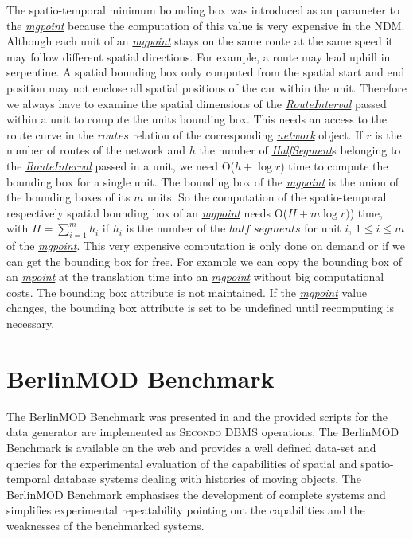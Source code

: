 \documentclass[a4paper]{article}
\newcommand{\secondo}{\textsc{Secondo}}
\newcommand{\bmodb} {BerlinMOD Benchmark}
\newcommand{\dt}[1]{\textsl{\underline{#1}}}
\begin{document}
{The spatio-temporal minimum bounding box was introduced as an parameter to the
\dt{mgpoint} because the computation of this value is very expensive in the
NDM. Although each unit of an \dt{mgpoint} stays on the same route
at the same speed it may follow different spatial directions. For example, a route may
lead uphill in serpentine. A spatial bounding box only computed from the spatial
start and end position may not enclose all spatial positions of the car within
the unit. Therefore we always have to examine the spatial dimensions of the
\dt{RouteInterval} passed within a unit to compute the units bounding box. This
needs an access to the route curve in the $routes$ relation of the corresponding
\dt{network} object. If $r$ is the number of routes
of the network and $h$ the number of \dt{HalfSegment}s belonging to the \dt{RouteInterval}
passed in a unit, we need O($h + \log r$) time to
compute the bounding box for a single unit. The bounding box of the \dt{mgpoint}
is the union of the bounding boxes of its $m$ units. So the computation of the
spatio-temporal respectively spatial bounding box of an \dt{mgpoint} needs
O($H + m \log r)$) time, with $H = \sum_{i=1}^m {h_i}$ if $h_i$ is the number of the
$half$ $segments$ for unit $i$, $1 \leq i \leq m$ of the \dt{mgpoint}. This very expensive computation is only done
on demand or if we can get the bounding box for free. For example we can copy
the bounding box of an \dt{mpoint} at the translation time into an \dt{mgpoint}
without big computational costs. The bounding box attribute is not maintained. If
the \dt{mgpoint} value changes, the bounding box attribute is set to be undefined
until recomputing is necessary.
\section{BerlinMOD Benchmark}
\label{sec:bmodb}
The \bmodb{} was presented in \cite{BerlinMODVLDB} and the
provided scripts for the data generator are implemented as \secondo{} DBMS operations.
The \bmodb{} is available on the web \cite{berlinmodweb} and provides a well defined
data-set and queries for the experimental evaluation of the capabilities of
spatial and spatio-temporal database systems dealing with histories of moving
objects. The \bmodb{} emphasises the development of complete systems
and simplifies experimental repeatability pointing out the capabilities and the
weaknesses of the benchmarked systems.

}
\end{document}
